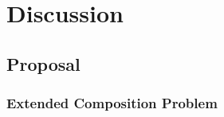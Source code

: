 \documentclass[senior,final,11pt]{iscs-thesis}
\begin{document}
\chapter{Discussion}


\section{Proposal}
\subsection{Extended Composition Problem}

\end{document}
